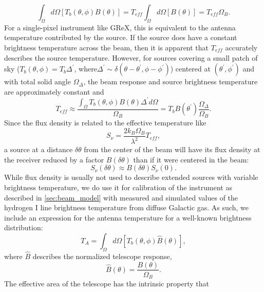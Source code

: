 \begin{equation*}
    \int_\Omega d\Omega\left[T_b(\theta,\phi)B(\theta)\right]=T_{eff}\int_\Omega d\Omega\left[B(\theta)\right]=T_{eff}\Omega_B.
\end{equation*}
For a single-pixel instrument like GReX, this is equivalent to the antenna temperature contributed by the source. 
If the source does have a constant brightness temperature across the beam, then it is apparent that $T_{eff}$ accurately describes the source temperature. 
However, for sources covering a small patch of sky ($T_b(\theta,\phi)=T_b\Delta^\prime$, where$\Delta^\prime\sim\delta(\theta-\theta^\prime, \phi-\phi^\prime)$) centered at $(\theta^\prime,\phi^\prime)$ and with total solid angle $\Omega_\Delta$, the beam response and source brightness temperature are approximately constant and
\begin{equation*}
    T_{eff}\approx\frac{\int_\Omega T_b(\theta,\phi)B(\theta)\Delta^\prime d\Omega}{\Omega_B} =T_b B(\theta^\prime)\frac{\Omega_\Delta}{\Omega_B}.
\end{equation*}
Since the flux density is related to the effective temperature like
\begin{equation*}
    S_\nu=\frac{2k_B\Omega_B}{\lambda^2}T_{eff},
\end{equation*}
a source at a distance $\delta\theta$ from the center of the beam will have its flux density at the receiver reduced by a factor $B(\delta\theta)$ than if it were centered in the beam:
\begin{equation*}
    S_\nu(\delta\theta) \approx B(\delta\theta)S_\nu(0). \label{eq:FnuAstro}
\end{equation*}
While flux density is usually not used to describe extended sources with variable brightness temperature, we do use it for calibration of the instrument as described in \autoref{sec:beam_model} with measured and simulated values of the hydrogen I line brightness temperature from diffuse Galactic gas. 
As such, we include an expression for the antenna temperature for a well-known brightness distribution:
\begin{equation}
    T_{A}=\int_\Omega d\Omega \left[T_b(\theta,\phi)\hat{B}(\theta)\right],\label{eq:Teff}
\end{equation}
where $\hat{B}$ describes the normalized telescope response,
\begin{equation}
    \hat{B}(\theta)=\frac{B(\theta)}{\Omega_B}.\label{eq:Bnorm}
\end{equation}
The effective area of the telescope has the intrinsic property that
